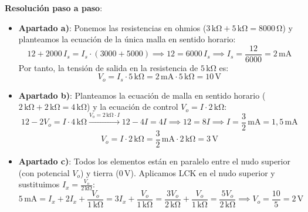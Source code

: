 \begin{ejercicio}
\textbf{Resolución paso a paso}:
\begin{itemize}
    \item \textbf{Apartado a)}: Ponemos las resistencias en ohmios ($3\,\si{\kilo\ohm} + 5\,\si{\kilo\ohm} = 8000\,\si{\ohm}$) y planteamos la ecuación de la única malla en sentido horario:
    \begin{equation*}
        12 + 2000\,I_s = I_s\cdot(3000 + 5000) \implies 12 = 6000\,I_s \implies I_s = \frac{12}{6000} = 2\,\si{\milli\ampere}
    \end{equation*}
    Por tanto, la tensión de salida en la resistencia de $5\,\si{\kilo\ohm}$ es:
    \begin{equation*}
        \boxed{V_o = I_s \cdot 5\,\si{\kilo\ohm} = 2\,\si{\milli\ampere}\cdot 5\,\si{\kilo\ohm} = 10\,\si{\volt}}
    \end{equation*}
    \item \textbf{Apartado b)}: Planteamos la ecuación de malla en sentido horario ($2\,\si{\kilo\ohm} + 2\,\si{\kilo\ohm} = 4\,\si{\kilo\ohm}$) y la ecuación de control $V_o = I\cdot 2\,\si{\kilo\ohm}$:
    \begin{equation*}
        12 - 2 V_o = I\cdot 4\,\si{\kilo\ohm} \xrightarrow{V_o = 2\,\si{\kilo\ohm}\cdot I} 12 - 4 I = 4 I \implies 12 = 8 I \implies I = \frac{3}{2}\,\si{\milli\ampere} = 1{,}5\,\si{\milli\ampere}
    \end{equation*}
    \begin{equation*}
        \boxed{V_o = I\cdot 2\,\si{\kilo\ohm} = \frac{3}{2}\,\si{\milli\ampere}\cdot 2\,\si{\kilo\ohm} = 3\,\si{\volt}}
    \end{equation*}
    \item \textbf{Apartado c)}: Todos los elementos están en paralelo entre el nudo superior (con potencial $V_o$) y tierra ($0\,\si{\volt}$). Aplicamos LCK en el nudo superior y sustituimos $I_x = \frac{V_o}{2\,\si{\kilo\ohm}}$:
    \begin{equation*}
        5\,\si{\milli\ampere} = I_x + 2 I_x + \frac{V_o}{1\,\si{\kilo\ohm}} = 3 I_x + \frac{V_o}{1\,\si{\kilo\ohm}} = \frac{3 V_o}{2\,\si{\kilo\ohm}} + \frac{V_o}{1\,\si{\kilo\ohm}} = \frac{5 V_o}{2\,\si{\kilo\ohm}} \implies \boxed{V_o = \frac{10}{5} = 2\,\si{\volt}}
    \end{equation*}
\end{itemize}
\end{ejercicio}

